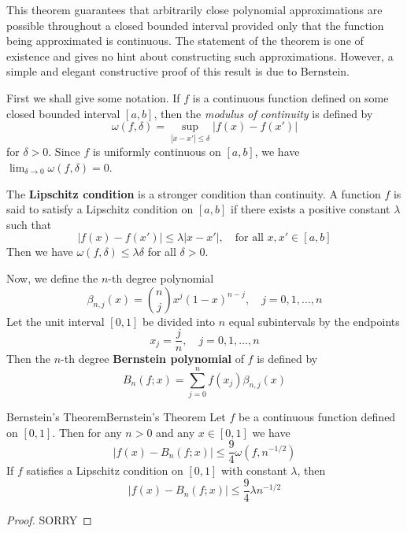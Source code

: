 \documentclass[../main.tex]{subfiles}
\begin{document}
This theorem guarantees that arbitrarily close polynomial approximations are possible throughout a closed bounded interval provided only that the function being approximated is continuous. The statement of the theorem is one of existence and gives no hint about constructing such approximations. However, a simple and elegant constructive proof of this result is due to Bernstein.

First we shall give some notation. If $f$ is a continuous function defined on some closed bounded interval $[a,b]$, then the \emph{modulus of continuity} is defined by
\begin{equation}
	\omega(f, \delta) = \sup_{|x-x'| \leq \delta} |f(x) - f(x')|
\end{equation}
for $\delta > 0$. Since $f$ is uniformly continuous on $[a,b]$, we have $\lim_{\delta \to 0} \omega(f, \delta) = 0$.

The \textbf{Lipschitz condition} is a stronger condition than continuity. A function $f$ is said to satisfy a Lipschitz condition on $[a,b]$ if there exists a positive constant $\lambda$ such that
\begin{equation}
	|f(x) - f(x')| \leq \lambda |x - x'|, \quad \text{for all } x, x' \in [a,b]
\end{equation}
Then we have $\omega(f, \delta) \leq \lambda \delta$ for all $\delta > 0$.

Now, we define the $n$-th degree polynomial
\begin{equation}
	\beta_{n,j}(x) = \binom{n}{j} x^j (1-x)^{n-j}, \quad j = 0, 1, \dots, n
\end{equation}
Let the unit interval $[0,1]$ be divided into $n$ equal subintervals by the endpoints
\begin{equation}
	x_j = \frac{j}{n}, \quad j = 0, 1, \dots, n
\end{equation}
Then the $n$-th degree \textbf{Bernstein polynomial} of $f$ is defined by
\begin{equation}
	B_n(f;x) = \sum_{j=0}^n f(x_j) \beta_{n,j}(x)
\end{equation}

\begin{theorem}{Bernstein's Theorem}{Bernstein's Theorem}
	Let $f$ be a continuous function defined on $[0,1]$. Then for any $n > 0$ and any $x \in [0,1]$ we have
	\begin{equation}
		|f(x) - B_n(f;x)| \leq \frac{9}{4} \omega(f, n^{-1/2})
	\end{equation}
	If $f$ satisfies a Lipschitz condition on $[0,1]$ with constant $\lambda$, then
	\begin{equation}
		|f(x) - B_n(f;x)| \leq \frac{9}{4} \lambda n^{-1/2}
	\end{equation}
\end{theorem}
\begin{proof}
	SORRY
\end{proof}
\end{document}
